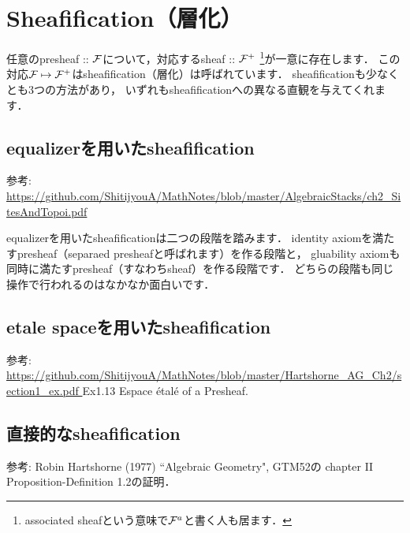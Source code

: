 \documentclass[]{jsarticle}
\begin{document}
\section{Sheafification（層化）}
    任意のpresheaf :: $\mathcal{F}$について，対応するsheaf :: $\mathcal{F}^+$
    \footnote{ associated sheafという意味で$\mathcal{F}^a$と書く人も居ます． }が一意に存在します．
    この対応$\mathcal{F} \mapsto \mathcal{F}^+$はsheafification（層化）は呼ばれています．
    sheafificationも少なくとも$3$つの方法があり，
    いずれもsheafificationへの異なる直観を与えてくれます．
    
    \subsection{equalizerを用いたsheafification}
    参考: \url{ https://github.com/ShitijyouA/MathNotes/blob/master/AlgebraicStacks/ch2_SitesAndTopoi.pdf }

    equalizerを用いたsheafificationは二つの段階を踏みます．
    identity axiomを満たすpresheaf（separaed presheafと呼ばれます）を作る段階と，
    gluability axiomも同時に満たすpresheaf（すなわちsheaf）を作る段階です．
    どちらの段階も同じ操作で行われるのはなかなか面白いです．

    \subsection{etale spaceを用いたsheafification}
    参考: \url{ https://github.com/ShitijyouA/MathNotes/blob/master/Hartshorne_AG_Ch2/section1_ex.pdf }
    Ex1.13 Espace \'etal\'e of a Presheaf.

    \subsection{直接的なsheafification}
    参考: Robin Hartshorne (1977) ``Algebraic Geometry", GTM52の
    chapter II Proposition-Definition 1.2の証明．
    
\end{document}

